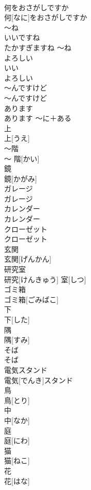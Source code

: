 \documentclass[8pt]{extreport}
\begin{document}
\begin{CJK}{UTF8}{min}
\\	何をおさがしですか	
\\	何[なに]をおさがしですか		
\\	〜ね	
\\	いいですね 
\\	たかすぎますね	〜ね		
\\	よろしい	
\\	いい 
\\	よろしい		
\\	〜んですけど	
\\	〜んですけど		
\\	あります	
\\	あります	〜に＋ある	
\\	上	
\\	上[うえ]		
\\	〜階	
\\	〜 階[かい]		
\\	鏡	
\\	鏡[かがみ]		
\\	ガレージ	
\\	ガレージ		
\\	カレンダー	
\\	カレンダー		
\\	クローゼット	
\\	クローゼット		
\\	玄関	
\\	玄関[げんかん]		
\\	研究室	
\\	研究[けんきゅう] 室[しつ]		
\\	ゴミ箱	
\\	ゴミ箱[ごみばこ]		
\\	下	
\\	下[した]		
\\	隅	
\\	隅[すみ]		
\\	そば	
\\	そば		
\\	電気スタンド	
\\	電気[でんき]スタンド		
\\	鳥	
\\	鳥[とり]		
\\	中	
\\	中[なか]		
\\	庭	
\\	庭[にわ]		
\\	猫	
\\	猫[ねこ]		
\\	花	
\\	花[はな]		

\end{CJK}
\end{document}
